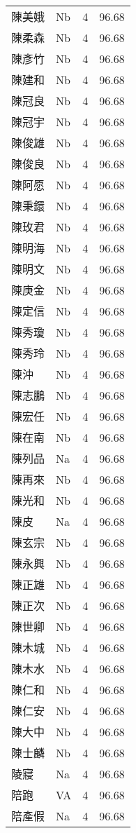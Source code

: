 \documentclass[twocolumn]{book}
\begin{document}
\begin{supertabular}{llrr}
陳美娥 & Nb & 4 &  96.68\\
陳柔森 & Nb & 4 &  96.68\\
陳彥竹 & Nb & 4 &  96.68\\
陳建和 & Nb & 4 &  96.68\\
陳冠良 & Nb & 4 &  96.68\\
陳冠宇 & Nb & 4 &  96.68\\
陳俊雄 & Nb & 4 &  96.68\\
陳俊良 & Nb & 4 &  96.68\\
陳阿愿 & Nb & 4 &  96.68\\
陳秉鐶 & Nb & 4 &  96.68\\
陳玫君 & Nb & 4 &  96.68\\
陳明海 & Nb & 4 &  96.68\\
陳明文 & Nb & 4 &  96.68\\
陳庚金 & Nb & 4 &  96.68\\
陳定信 & Nb & 4 &  96.68\\
陳秀瓊 & Nb & 4 &  96.68\\
陳秀玲 & Nb & 4 &  96.68\\
陳沖 & Nb & 4 &  96.68\\
陳志鵬 & Nb & 4 &  96.68\\
陳宏任 & Nb & 4 &  96.68\\
陳在南 & Nb & 4 &  96.68\\
陳列品 & Na & 4 &  96.68\\
陳再來 & Nb & 4 &  96.68\\
陳光和 & Nb & 4 &  96.68\\
陳皮 & Na & 4 &  96.68\\
陳玄宗 & Nb & 4 &  96.68\\
陳永興 & Nb & 4 &  96.68\\
陳正雄 & Nb & 4 &  96.68\\
陳正次 & Nb & 4 &  96.68\\
陳世卿 & Nb & 4 &  96.68\\
陳木城 & Nb & 4 &  96.68\\
陳木水 & Nb & 4 &  96.68\\
陳仁和 & Nb & 4 &  96.68\\
陳仁安 & Nb & 4 &  96.68\\
陳大中 & Nb & 4 &  96.68\\
陳士麟 & Nb & 4 &  96.68\\
陵寢 & Na & 4 &  96.68\\
陪跑 & VA & 4 &  96.68\\
陪產假 & Na & 4 &  96.68\\

\end{supertabular}
\end{document}
